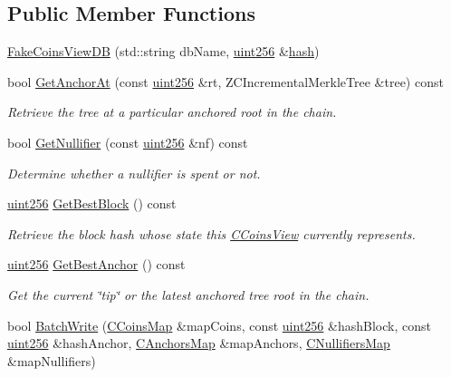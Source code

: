 \subsection*{Public Member Functions}
\begin{DoxyCompactItemize}
\item 
\mbox{\hyperlink{class_fake_coins_view_d_b_a88aa1d7a9c9136a3ef5f884e76989635}{Fake\+Coins\+View\+DB}} (std\+::string db\+Name, \mbox{\hyperlink{classuint256}{uint256}} \&\mbox{\hyperlink{class_fake_coins_view_d_b_a982f684b55a8f103df3f43b7128f6938}{hash}})
\item 
bool \mbox{\hyperlink{class_fake_coins_view_d_b_ae52d0073bef3eb64bd64b325e821c52b}{Get\+Anchor\+At}} (const \mbox{\hyperlink{classuint256}{uint256}} \&rt, Z\+C\+Incremental\+Merkle\+Tree \&tree) const
\begin{DoxyCompactList}\small\item\em Retrieve the tree at a particular anchored root in the chain. \end{DoxyCompactList}\item 
bool \mbox{\hyperlink{class_fake_coins_view_d_b_af7d0ce4926fb03ee632148c5fde66c05}{Get\+Nullifier}} (const \mbox{\hyperlink{classuint256}{uint256}} \&nf) const
\begin{DoxyCompactList}\small\item\em Determine whether a nullifier is spent or not. \end{DoxyCompactList}\item 
\mbox{\hyperlink{classuint256}{uint256}} \mbox{\hyperlink{class_fake_coins_view_d_b_a36231d924114fbe51a830c9c235c50ad}{Get\+Best\+Block}} () const
\begin{DoxyCompactList}\small\item\em Retrieve the block hash whose state this \mbox{\hyperlink{class_c_coins_view}{C\+Coins\+View}} currently represents. \end{DoxyCompactList}\item 
\mbox{\hyperlink{classuint256}{uint256}} \mbox{\hyperlink{class_fake_coins_view_d_b_af7870faf849e59188344273a03c9a1b0}{Get\+Best\+Anchor}} () const
\begin{DoxyCompactList}\small\item\em Get the current \char`\"{}tip\char`\"{} or the latest anchored tree root in the chain. \end{DoxyCompactList}\item 
bool \mbox{\hyperlink{class_fake_coins_view_d_b_a1108b45f9d165344c7378051e061147b}{Batch\+Write}} (\mbox{\hyperlink{coins_8h_a2886ba2fd0428bae777e1cbcabc02834}{C\+Coins\+Map}} \&map\+Coins, const \mbox{\hyperlink{classuint256}{uint256}} \&hash\+Block, const \mbox{\hyperlink{classuint256}{uint256}} \&hash\+Anchor, \mbox{\hyperlink{coins_8h_a070827cc9d21a91b8f4f4f52a6f7c848}{C\+Anchors\+Map}} \&map\+Anchors, \mbox{\hyperlink{coins_8h_ab651cc287e9594190ef77d2fca2b14c7}{C\+Nullifiers\+Map}} \&map\+Nullifiers)

\end{DoxyCompactItemize}
